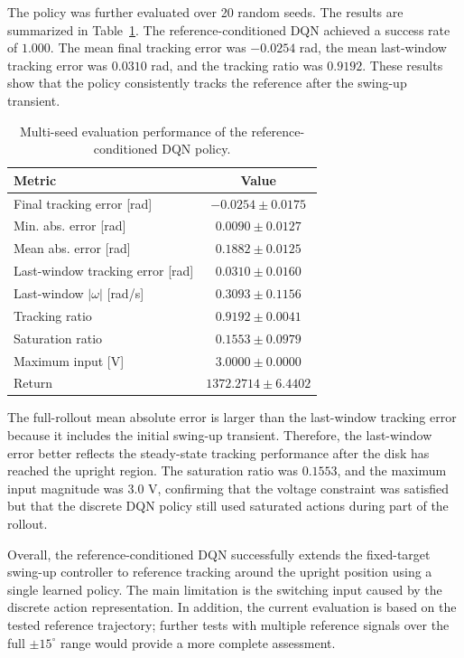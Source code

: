 The policy was further evaluated over 20 random seeds. The results are
summarized in Table~\ref{tab:ref_dqn_results}. The reference-conditioned DQN
achieved a success rate of \(1.000\). The mean final tracking error was
\(-0.0254\) rad, the mean last-window tracking error was \(0.0310\) rad, and
the tracking ratio was \(0.9192\). These results show that the policy
consistently tracks the reference after the swing-up transient.

\begin{table}[htbp]
    \caption{Multi-seed evaluation performance of the reference-conditioned
    DQN policy.}
    \centering
    \begin{tabular}{lc}
        \toprule
        Metric & Value \\
        \midrule
        Final tracking error [rad] & $-0.0254 \pm 0.0175$ \\
        Min. abs. error [rad] & $0.0090 \pm 0.0127$ \\
        Mean abs. error [rad] & $0.1882 \pm 0.0125$ \\
        Last-window tracking error [rad] & $0.0310 \pm 0.0160$ \\
        Last-window $|\omega|$ [rad/s] & $0.3093 \pm 0.1156$ \\
        Tracking ratio & $0.9192 \pm 0.0041$ \\
        Saturation ratio & $0.1553 \pm 0.0979$ \\
        Maximum input [V] & $3.0000 \pm 0.0000$ \\
        Return & $1372.2714 \pm 6.4402$ \\
        \bottomrule
    \end{tabular}
    \label{tab:ref_dqn_results}
\end{table}

The full-rollout mean absolute error is larger than the last-window tracking
error because it includes the initial swing-up transient. Therefore, the
last-window error better reflects the steady-state tracking performance after
the disk has reached the upright region. The saturation ratio was \(0.1553\),
and the maximum input magnitude was \(3.0\) V, confirming that the voltage
constraint was satisfied but that the discrete DQN policy still used saturated
actions during part of the rollout.

Overall, the reference-conditioned DQN successfully extends the fixed-target
swing-up controller to reference tracking around the upright position using a
single learned policy. The main limitation is the switching input caused by the
discrete action representation. In addition, the current evaluation is based on
the tested reference trajectory; further tests with multiple reference signals
over the full \(\pm 15^\circ\) range would provide a more complete assessment.
